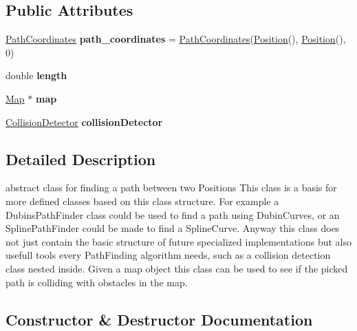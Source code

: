\subsection*{Public Attributes}
\begin{DoxyCompactItemize}
\item 
\mbox{\label{class_path2_d_1_1_path_finder_a91d4111a80bb3d5cde042169fab4337e}} 
\mbox{\hyperlink{class_path2_d_1_1_element_1_1_path_coordinates}{Path\+Coordinates}} {\bfseries path\+\_\+coordinates} = \mbox{\hyperlink{class_path2_d_1_1_element_1_1_path_coordinates}{Path\+Coordinates}}(\mbox{\hyperlink{class_path2_d_1_1_element_1_1_position}{Position}}(), \mbox{\hyperlink{class_path2_d_1_1_element_1_1_position}{Position}}(), 0)
\item 
\mbox{\label{class_path2_d_1_1_path_finder_a71fb23328f7dd376cce578b34441c10a}} 
double {\bfseries length}
\item 
\mbox{\label{class_path2_d_1_1_path_finder_a9db26e8edde93af781907314b0cf2e9b}} 
\mbox{\hyperlink{class_map}{Map}} $\ast$ {\bfseries map}
\item 
\mbox{\label{class_path2_d_1_1_path_finder_a81fab59437d1f65f6c1a6aaf796c40ed}} 
\mbox{\hyperlink{class_path2_d_1_1_path_finder_1_1_collision_detector}{Collision\+Detector}} {\bfseries collision\+Detector}
\end{DoxyCompactItemize}


\subsection{Detailed Description}
abstract class for finding a path between two Positions  This class is a basis for more defined classes based on this class structure. For example a Dubins\+Path\+Finder class could be used to find a path using Dubin\+Curves, or an Spline\+Path\+Finder could be made to find a Spline\+Curve. Anyway this class does not just contain the basic structure of future specialized implementations but also usefull tools every Path\+Finding algorithm needs, such as a collision detection class nested inside. Given a map object this class can be used to see if the picked path is colliding with obstacles in the map. 

\subsection{Constructor \& Destructor Documentation}
\mbox{\label{class_path2_d_1_1_path_finder_a0aa8bbd238985f5baa456287671551ea}} 
